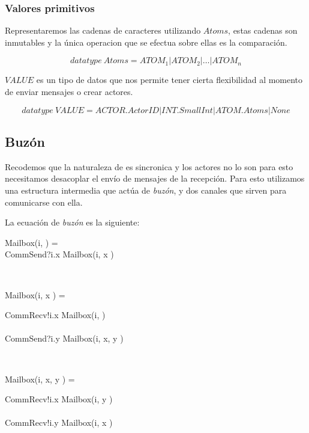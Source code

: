 \subsubsection{Valores primitivos}

Representaremos las cadenas de caracteres utilizando $Atoms$, estas cadenas son inmutables y la única operacion que se efectua sobre ellas es la comparación.

\[
  datatype\ Atoms = ATOM_1 | ATOM_2 | \ldots | ATOM_n
\]

$VALUE$ es un tipo de datos que nos permite tener cierta flexibilidad al momento de enviar mensajes o crear actores. 

\[
  datatype\ VALUE = ACTOR.ActorID | INT.SmallInt | ATOM.Atoms | None
\]

\subsection{Buzón} 

Recodemos que la naturaleza de \CSP es sincronica y los actores no lo son para esto necesitamos desacoplar el envío de mensajes de la recepción. Para esto utilizamos una estructura intermedia que actúa de \textit{buzón}, y dos canales que sirven para comunicarse con ella.

La ecuación de \textit{buzón} es la siguiente:

\begin{process}
\begin{block}
Mailbox(i, \nil) = {} \\ \quad
CommSend?i.x \then Mailbox(i, \lseq x \rseq) 
\end{block} \\

\begin{block}
Mailbox(i, \lseq x \rseq) = {} \\ \quad 
  \begin{block}
    CommRecv!i.x \then Mailbox(i, \nil) \\
    \Extchoice \\
    CommSend?i.y \then Mailbox(i, \lseq x, y \rseq) 
  \end{block}
\end{block} \\

\begin{block}
Mailbox(i, \lseq x, y \rseq) = {} \\ \quad
  \begin{block}
    CommRecv!i.x \then Mailbox(i, \lseq y \rseq) \\
    \Extchoice \\
    CommRecv!i.y \then Mailbox(i, \lseq x \rseq) 
  \end{block} 
\end{block}

\end{process}

